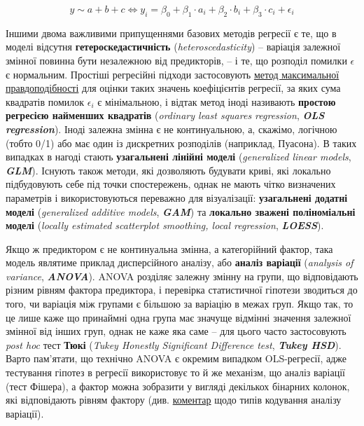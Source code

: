 \documentclass[
  11pt,
]{book}
\begin{document}
\[y \sim a + b + c \Longleftrightarrow y_i = \beta_0 + \beta_1 \cdot a_i + \beta_2 \cdot b_i + \beta_3 \cdot c_i + \epsilon_i\]

Іншими двома важливими припущеннями базових методів регресії є те, що в моделі відсутня \textbf{гетероскедастичність} (\emph{heteroscedasticity}) -- варіація залежної змінної повинна бути незалежною від предикторів, -- і те, що розподіл помилки \(\epsilon\) є нормальним. Простіші регресійні підходи застосовують \hyperref[mle]{метод максимальної правдоподібності} для оцінки таких значень коефіцієнтів регресії, за яких сума квадратів помилок \(\epsilon_i\) є мінімальною, і відтак метод іноді називають \textbf{простою регресією найменших квадратів} (\emph{ordinary least squares regression}, \textbf{\emph{OLS regression}}). Іноді залежна змінна є не континуальною, а, скажімо, логічною (тобто 0/1) або має один із дискретних розподілів (наприклад, Пуасона). В таких випадках в нагоді стають \textbf{узагальнені лінійні моделі} (\emph{generalized linear models}, \textbf{\emph{GLM}}). Існують також методи, які дозволяють будувати криві, які локально підбудовують себе під точки спостережень, однак не мають чітко визначених параметрів і використовуються переважно для візуалізації: \textbf{узагальнені додатні моделі} (\emph{generalized additive models}, \textbf{\emph{GAM}}) та \textbf{локально зважені поліноміальні моделі} (\emph{locally estimated scatterplot smoothing, local regression}, \textbf{\emph{LOESS}}).

Якщо ж предиктором є не континуальна змінна, а категорійний фактор, така модель являтиме приклад дисперсійного аналізу, або \textbf{аналіз варіації} (\emph{analysis of variance}, \textbf{\emph{ANOVA}}). ANOVA розділяє залежну змінну на групи, що відповідають різним рівням фактора предиктора, і перевірка статистичної гіпотези зводиться до того, чи варіація між групами є більшою за варіацію в межах груп. Якщо так, то це лише каже що принаймні одна група має значуще відмінні значення залежної змінної від інших груп, однак не каже яка саме -- для цього часто застосовують \emph{post hoc} тест \textbf{Тюкі} (\emph{Tukey Honestly Significant Difference test}, \textbf{\emph{Tukey HSD}}). Варто пам'ятати, що технічно ANOVA є окремим випадком OLS-регресії, адже тестування гіпотез в регресії використовує то й же механізм, що аналіз варіації (тест Фішера), а фактор можна зобразити у вигляді декількох бінарних колонок, які відповідають рівням фактору (див. \href{https://mcfromnz.wordpress.com/2011/03/02/anova-type-iiiiii-ss-explained/}{коментар} щодо типів кодування аналізу варіації).
\end{document}
